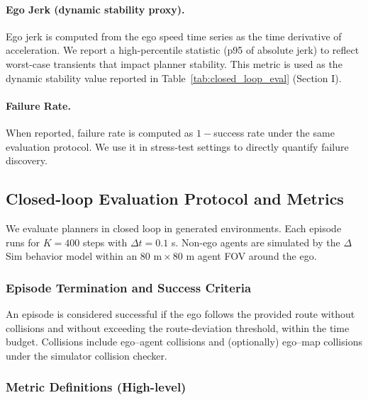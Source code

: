 \documentclass{article}
\theoremstyle{plain}
\theoremstyle{definition}
\theoremstyle{remark}
\begin{document}
\paragraph{Ego Jerk (dynamic stability proxy).}
Ego jerk is computed from the ego speed time series as the time derivative of acceleration.
We report a high-percentile statistic (p95 of absolute jerk) to reflect worst-case transients that impact planner stability.
This metric is used as the dynamic stability value reported in Table~\ref{tab:closed_loop_eval} (Section I).

\paragraph{Failure Rate.}
When reported, failure rate is computed as \(1-\)success rate under the same evaluation protocol.
We use it in stress-test settings to directly quantify failure discovery.


\subsection{Closed-loop Evaluation Protocol and Metrics}
\label{app:closedloop}

We evaluate planners in closed loop in generated environments. Each episode runs for \(K{=}400\) steps with \(\Delta t{=}0.1\) s.
Non-ego agents are simulated by the \(\Delta\)Sim behavior model within an \(80\text{ m}\times 80\text{ m}\) agent FOV around the ego.

\subsubsection{Episode Termination and Success Criteria}

An episode is considered successful if the ego follows the provided route without collisions and without exceeding the route-deviation
threshold, within the time budget. Collisions include ego--agent collisions and (optionally) ego--map collisions under the simulator
collision checker.

\subsubsection{Metric Definitions (High-level)}
\end{document}
